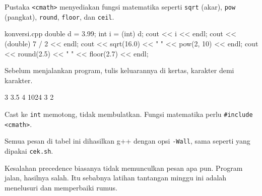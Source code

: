 \documentclass[a4paper]{article}
\begin{document}
Pustaka \texttt{<cmath>} menyediakan fungsi matematika seperti \texttt{sqrt} (akar), \texttt{pow} (pangkat), \texttt{round}, \texttt{floor}, dan \texttt{ceil}.

\begin{MKode}{konversi.cpp}
double d = 3.99;
int i = (int) d;
cout << i << endl;
cout << (double) 7 / 2 << endl;
cout << sqrt(16.0) << " " << pow(2, 10) << endl;
cout << round(2.5) << " " << floor(2.7) << endl;
\end{MKode}
\begin{Tebak}[]
Sebelum menjalankan program, tulis keluarannya di kertas, karakter demi karakter.
\end{Tebak}
\begin{Jawaban}[]
\begin{MKeluaran}[]
3
3.5
4 1024
3 2
\end{MKeluaran}
Cast ke \texttt{int} memotong, tidak membulatkan. Fungsi matematika perlu \texttt{\#include <cmath>}.
\end{Jawaban}
Semua pesan di tabel ini dihasilkan g++ dengan opsi \texttt{-Wall}, sama seperti yang dipakai \texttt{cek.sh}.
\par\vspace{4pt}\par\vspace{6pt}
Kesalahan precedence biasanya tidak memunculkan pesan apa pun. Program jalan, hasilnya salah. Itu sebabnya latihan tantangan minggu ini adalah menelusuri dan memperbaiki rumus.
\end{document}
